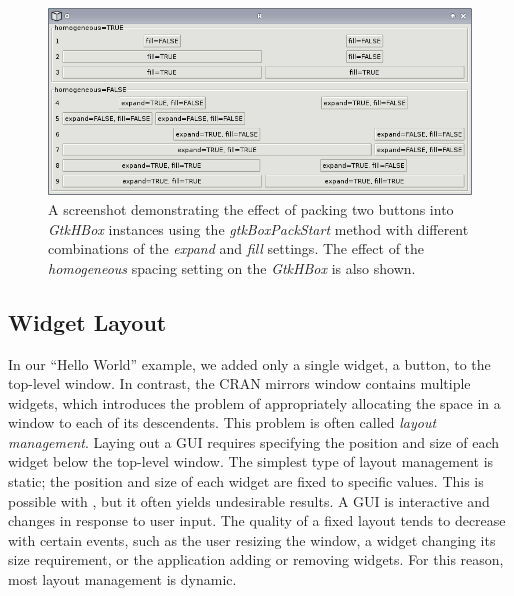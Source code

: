 \documentclass[article]{jss}
\begin{document}
\begin{figure}
\begin{center}
\includegraphics{packing.png}
\caption{\label{fig:packing}A screenshot demonstrating the effect of packing two
buttons into \emph{GtkHBox} instances using the \emph{gtkBoxPackStart} method 
with different combinations of the \emph{expand} and \emph{fill} settings. 
The effect of the \emph{homogeneous} spacing setting on the \emph{GtkHBox} is 
also shown.}
\end{center}
\end{figure}

\subsection{Widget Layout}\label{sec:layout}

In our ``Hello World'' example, we added only a single widget, a button, to the 
top-level window. In contrast, the CRAN mirrors window contains multiple 
widgets, which introduces the problem of appropriately allocating the space in a
window to each of its descendents. This problem is often called \emph{layout management}.
Laying out a GUI requires specifying the position and size of each widget below
the top-level window. The simplest type of layout management is static; the
position and size of each widget are fixed to specific values. This is possible
with , but it often yields undesirable results. A GUI is interactive 
and changes in response to user input. The quality of a fixed layout tends to decrease
with certain events, such as the user resizing
the window, a widget changing its size requirement, or the application
adding or removing widgets. For this reason, most layout management is dynamic.
\end{document}
